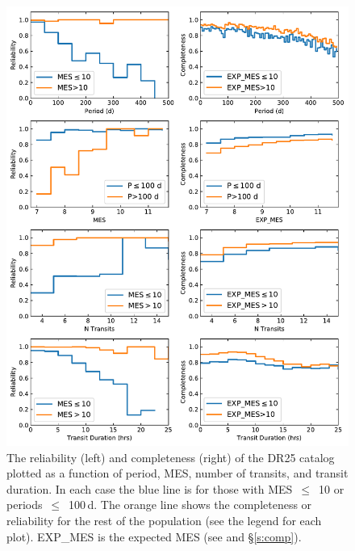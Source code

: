 \begin{figure}[hp]
 \begin{center}
  \includegraphics[width=0.875\linewidth]{f9.pdf}
  \caption{The reliability (left) and completeness (right)  of the DR25 catalog plotted as a function of period, MES, number of transits, and transit duration. In each case the blue line is for those with MES~$\leq$~10 or periods~$\leq$~100\,d. The orange line shows the completeness or reliability for the rest of the population (see the legend for each plot). EXP\_MES is the expected MES (see \citealt{Christiansen2017} and \S\ref{s:comp}).}
  \label{f:1dcompare}
 \end{center}
 \end{figure}



